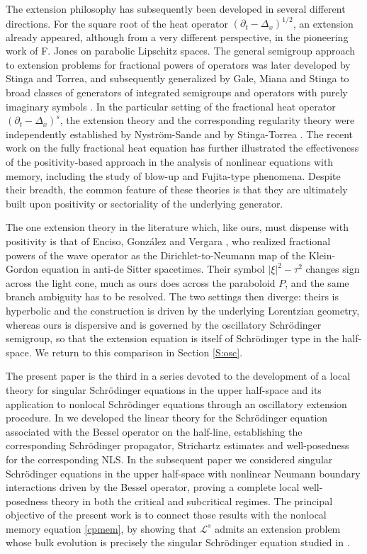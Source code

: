 \documentclass[11pt,letter]{amsart}
\numberwithin{equation}{section}
\newcommand{\Le}{\mathcal L}
\numberwithin{equation}{section}
\begin{document}
The extension philosophy has subsequently been developed in several different
directions. For the square root of the heat operator
$(\partial_t-\Delta_x)^{1/2}$, an extension already appeared, although from a
very different perspective, in the pioneering work of F. Jones \cite{Jo} on
parabolic Lipschitz spaces. The general semigroup approach to extension problems
for fractional powers of operators was later developed by Stinga and Torrea,
and subsequently generalized by Gale, Miana and Stinga to broad classes of
generators of integrated semigroups and operators with purely imaginary symbols
\cite{GMS}. In the particular setting of the fractional heat operator
$(\partial_t-\Delta_x)^s$, the extension theory and the corresponding
regularity theory were independently established by Nystr\"om-Sande and by
Stinga-Torrea \cite{NyS,ST}. The recent work \cite{FD} on the fully fractional heat equation has further illustrated the effectiveness of the positivity-based approach in the analysis of nonlinear equations with memory, including the study of blow-up and Fujita-type phenomena.
Despite their breadth, the common feature of these theories is that they are
ultimately built upon positivity or sectoriality of the underlying generator.

The one extension theory in the literature which, like ours, must dispense with
positivity is that of Enciso, Gonz\'alez and Vergara \cite{EGV}, who realized
fractional powers of the wave operator as the Dirichlet-to-Neumann map of the
Klein-Gordon equation in anti-de Sitter spacetimes. Their symbol
$|\xi|^2-\tau^2$ changes sign across the light cone, much as ours does across
the paraboloid $P$, and the same branch ambiguity has to be resolved. The two
settings then diverge: theirs is hyperbolic and the construction is driven by
the underlying Lorentzian geometry, whereas ours is dispersive and is governed
by the oscillatory Schr\"odinger semigroup, so that the extension equation is
itself of Schr\"odinger type in the half-space. We return to this comparison in
Section \ref{S:osc}.

The present paper is the third in a series devoted to the development of a local
theory for singular Schr\"odinger equations in the upper half-space and its
application to nonlocal Schr\"odinger equations through an oscillatory extension
procedure. In \cite{GS1} we developed the linear theory for the Schr\"odinger
equation associated with the Bessel operator on the half-line, establishing the
corresponding Schr\"odinger propagator, Strichartz estimates and well-posedness for the corresponding NLS.
In the subsequent paper \cite{GS2} we considered singular Schr\"odinger
equations in the upper half-space with nonlinear Neumann boundary interactions
driven by the Bessel operator, proving a complete local well-posedness theory in both
the critical and subcritical regimes. The principal objective of the present
work is to connect those results with the nonlocal memory equation
\eqref{cpmem}, by showing that $\Le^s$ admits an extension problem whose bulk
evolution is precisely the singular Schr\"odinger equation studied in
\cite{GS2}.
\end{document}
